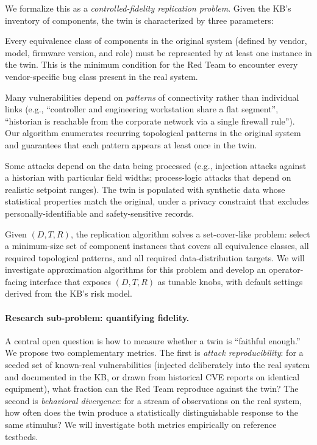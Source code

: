 We formalize this as a \emph{controlled-fidelity replication problem}.
Given the KB's inventory of components, the twin is characterized by
three parameters:

\begin{description}[leftmargin=1.6em,style=nextline,itemsep=0.15em,topsep=0.3em]
  \item[Diversity ($D$).] Every equivalence class of components in
  the original system (defined by vendor, model, firmware version, and
  role) must be represented by at least one instance in the twin.
  This is the minimum condition for the Red Team to encounter every
  vendor-specific bug class present in the real system.
  \item[Topology representation ($T$).] Many vulnerabilities depend
  on \emph{patterns} of connectivity rather than individual links
  (e.g., ``controller and engineering workstation share a flat
  segment'', ``historian is reachable from the corporate network via
  a single firewall rule''). Our algorithm enumerates recurring
  topological patterns in the original system and guarantees that
  each pattern appears at least once in the twin.
  \item[Data representation ($R$).] Some attacks depend on the data
  being processed (e.g., injection attacks against a historian with
  particular field widths; process-logic attacks that depend on
  realistic setpoint ranges). The twin is populated with synthetic
  data whose statistical properties match the original, under a
  privacy constraint that excludes personally-identifiable and
  safety-sensitive records.
\end{description}

Given $(D, T, R)$, the replication algorithm solves a set-cover-like
problem: select a minimum-size set of component instances that
covers all equivalence classes, all required topological patterns,
and all required data-distribution targets. We will investigate
approximation algorithms for this problem and develop an
operator-facing interface that exposes $(D, T, R)$ as tunable knobs,
with default settings derived from the KB's risk model.

\paragraph{Research sub-problem: quantifying fidelity.}
A central open question is how to measure whether a twin is
``faithful enough.'' We propose two complementary metrics. The first
is \emph{attack reproducibility}: for a seeded set of known-real
vulnerabilities (injected deliberately into the real system and
documented in the KB, or drawn from historical CVE reports on identical
equipment), what fraction can the Red Team reproduce against the
twin? The second is \emph{behavioral divergence}: for a stream of
observations on the real system, how often does the twin produce a
statistically distinguishable response to the same stimulus? We will
investigate both metrics empirically on reference testbeds.

